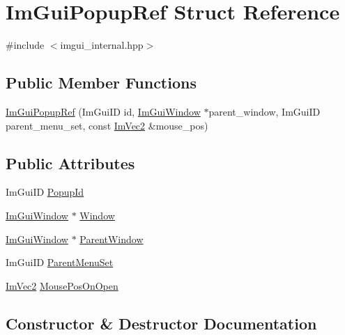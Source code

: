 \hypertarget{struct_im_gui_popup_ref}{}\section{Im\+Gui\+Popup\+Ref Struct Reference}
\label{struct_im_gui_popup_ref}


{\ttfamily \#include $<$imgui\+\_\+internal.\+hpp$>$}

\subsection*{Public Member Functions}
\begin{DoxyCompactItemize}
\item 
\hyperlink{struct_im_gui_popup_ref_af95848b705864b36b803745cd7b59250}{Im\+Gui\+Popup\+Ref} (Im\+Gui\+ID id, \hyperlink{struct_im_gui_window}{Im\+Gui\+Window} $\ast$parent\+\_\+window, Im\+Gui\+ID parent\+\_\+menu\+\_\+set, const \hyperlink{struct_im_vec2}{Im\+Vec2} \&mouse\+\_\+pos)
\end{DoxyCompactItemize}
\subsection*{Public Attributes}
\begin{DoxyCompactItemize}
\item 
Im\+Gui\+ID \hyperlink{struct_im_gui_popup_ref_a7037780575e28439414d28625a495bad}{Popup\+Id}
\item 
\hyperlink{struct_im_gui_window}{Im\+Gui\+Window} $\ast$ \hyperlink{struct_im_gui_popup_ref_a471027209038d1d59280a84c8d236f34}{Window}
\item 
\hyperlink{struct_im_gui_window}{Im\+Gui\+Window} $\ast$ \hyperlink{struct_im_gui_popup_ref_a7925cc312e5632661e0e6a2195af21b2}{Parent\+Window}
\item 
Im\+Gui\+ID \hyperlink{struct_im_gui_popup_ref_afc2fc749bf54a0e3bab8defefe4a0a2b}{Parent\+Menu\+Set}
\item 
\hyperlink{struct_im_vec2}{Im\+Vec2} \hyperlink{struct_im_gui_popup_ref_ae7640a4130be4ba7518aee17c500d366}{Mouse\+Pos\+On\+Open}
\end{DoxyCompactItemize}


\subsection{Constructor \& Destructor Documentation}
\hypertarget{struct_im_gui_popup_ref_af95848b705864b36b803745cd7b59250}{}\label{struct_im_gui_popup_ref_af95848b705864b36b803745cd7b59250} 
